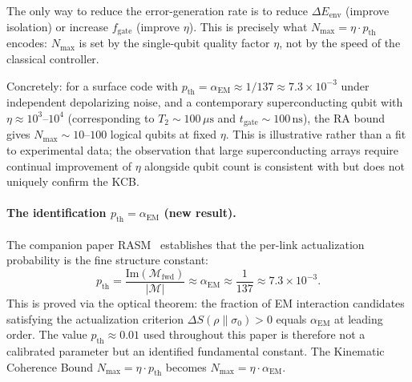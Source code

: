 \documentclass[11pt,a4paper]{article}
\theoremstyle{plain}
\theoremstyle{definition}
\theoremstyle{remark}
\begin{document}
The only way to reduce the
error-generation rate is to reduce $\Delta E_{\mathrm{env}}$ (improve isolation)
or increase $f_{\mathrm{gate}}$ (improve $\eta$). This is precisely what
$N_{\max} = \eta \cdot p_{\mathrm{th}}$ encodes: $N_{\max}$ is set by the
single-qubit quality factor $\eta$, not by the speed of the classical controller.

Concretely: for a surface code with $p_{\mathrm{th}} = \alpha_{\mathrm{EM}} \approx 1/137 \approx 7.3\times10^{-3}$ under
independent depolarizing noise, and a contemporary superconducting qubit with
$\eta \approx 10^3$--$10^4$ (corresponding to $T_2 \sim 100\,\mu\mathrm{s}$ and
$t_{\mathrm{gate}} \sim 100\,\mathrm{ns}$), the RA bound gives
$N_{\max} \sim 10$--$100$ logical qubits at fixed $\eta$. This is illustrative
rather than a fit to experimental data; the observation that large superconducting
arrays require continual improvement of $\eta$ alongside qubit count is consistent
with but does not uniquely confirm the KCB.

\paragraph{The identification $p_{\mathrm{th}} = \alpha_{\mathrm{EM}}$ (new result).}
The companion paper RASM~\citep{Sandeman2026RASM} establishes that the per-link
actualization probability is the fine structure constant:
\begin{equation}
  p_{\mathrm{th}} = \frac{\mathrm{Im}(\mathcal{M}_{\mathrm{fwd}})}{|\mathcal{M}|}
  \approx \alpha_{\mathrm{EM}} \approx \frac{1}{137} \approx 7.3\times10^{-3}.
\end{equation}
This is proved via the optical theorem: the fraction of EM interaction candidates
satisfying the actualization criterion $\Delta S(\rho\|\sigma_0) > 0$ equals
$\alpha_{\mathrm{EM}}$ at leading order. The value $p_{\mathrm{th}} \approx 0.01$
used throughout this paper is therefore not a calibrated parameter but an
identified fundamental constant. The Kinematic Coherence Bound
$N_{\max} = \eta \cdot p_{\mathrm{th}}$ becomes $N_{\max} = \eta \cdot \alpha_{\mathrm{EM}}$.
\end{document}
